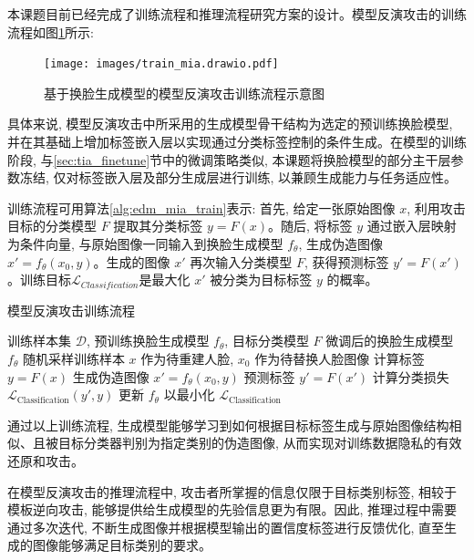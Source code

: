 本课题目前已经完成了训练流程和推理流程研究方案的设计。模型反演攻击的训练流程如图\ref{fig:edm_mia_train}所示:

\begin{figure}[!htbp]
  \centering
  \texttt{[image: images/train\_mia.drawio.pdf]}
  \caption{基于换脸生成模型的模型反演攻击训练流程示意图}
  \label{fig:edm_mia_train}
\end{figure}

具体来说, 模型反演攻击中所采用的生成模型骨干结构为选定的预训练换脸模型, 并在其基础上增加标签嵌入层以实现通过分类标签控制的条件生成。在模型的训练阶段, 与\ref{sec:tia_finetune}节中的微调策略类似, 本课题将换脸模型的部分主干层参数冻结, 仅对标签嵌入层及部分生成层进行训练, 以兼顾生成能力与任务适应性。

训练流程可用算法\ref{alg:edm_mia_train}表示: 首先, 给定一张原始图像 $x$, 利用攻击目标的分类模型 $F$ 提取其分类标签 $y = F(x)$。随后, 将标签 $y$ 通过嵌入层映射为条件向量, 与原始图像一同输入到换脸生成模型 $f_{\theta}$, 生成伪造图像 $x' = f_{\theta}(x_0, y)$。生成的图像 $x'$ 再次输入分类模型 $F$, 获得预测标签 $y' = F(x')$。训练目标$\mathcal{L}_{Classification}$是最大化 $x'$ 被分类为目标标签 $y$ 的概率。

\begin{algorithm}[H]
  \caption{模型反演攻击训练流程}
  \label{alg:edm_mia_train}
  \begin{algorithmic}[1]
    \REQUIRE 训练样本集 $\mathcal{D}$, 预训练换脸生成模型 $f_\theta$, 目标分类模型 $F$
    \ENSURE 微调后的换脸生成模型 $f_\theta$
    \STATE 随机采样训练样本 $x$ 作为待重建人脸, $x_0$ 作为待替换人脸图像
    \STATE 计算标签 $y = F(x)$
    \STATE 生成伪造图像 $x' = f_\theta(x_0, y)$
    \STATE 预测标签 $y' = F(x')$
    \STATE 计算分类损失 $\mathcal{L}_{\text{Classification}}(y', y)$
    \ENDFOR
    \STATE 更新 $f_\theta$ 以最小化 $\mathcal{L}_{\text{Classification}}$
    \ENDFOR
  \end{algorithmic}
\end{algorithm}

通过以上训练流程, 生成模型能够学习到如何根据目标标签生成与原始图像结构相似、且被目标分类器判别为指定类别的伪造图像, 从而实现对训练数据隐私的有效还原和攻击。

在模型反演攻击的推理流程中, 攻击者所掌握的信息仅限于目标类别标签, 相较于模板逆向攻击, 能够提供给生成模型的先验信息更为有限。因此, 推理过程中需要通过多次迭代, 不断生成图像并根据模型输出的置信度标签进行反馈优化, 直至生成的图像能够满足目标类别的要求。

